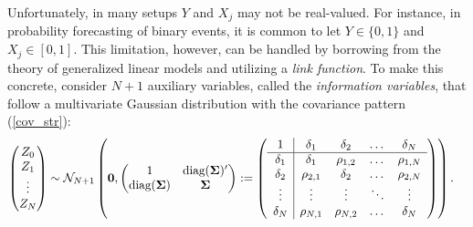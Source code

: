 \documentclass[11pt]{article}
\newcommand{\E}{\mathbb{E}}
\theoremstyle{definition}
\theoremstyle{definition}
\def\bSigma{{\bf \Sigma}}
\def\E{{\mathbb E}}
\def\diag{\text{diag}}
\def\diag{\text{diag}}
\begin{document}
Unfortunately, in many setups $Y$ and $X_j$ may not be real-valued. For instance, in probability forecasting of binary events, it is common to let $Y \in \{0,1\}$ and $X_j \in [0,1]$. This limitation, however, can be handled by borrowing from the theory of generalized linear models \citep{mccullagh1989generalized} and utilizing a \textit{link function}. To make this concrete, consider $N+1$ auxiliary variables, called the \textit{information variables}, that follow a multivariate Gaussian distribution with the covariance pattern (\ref{cov_str}):
\begin{align}
\left(\begin{matrix} Z_0 \\ Z_{1}\\ \vdots \\ Z_{N} \end{matrix}\right) &\sim \mathcal{N}_{N+1}\left( 
 \boldsymbol{0}, \left(\begin{matrix} 
1 & \diag(\bSigma)'\\
\diag(\bSigma) &\bSigma\\
 \end{matrix}\right) 
 :=
 \left(\begin{array}{c | c c cc }
1 & \delta_1 & \delta_2 & \dots & \delta_N  \\ \hline
\delta_1 & \delta_1 &\rho_{1,2} & \dots & \rho_{1,N}   \\ 
\delta_2 & \rho_{2,1} & \delta_2 & \dots & \rho_{2,N}  \\ 
\vdots & \vdots & \vdots & \ddots & \vdots  \\ 
\delta_N & \rho_{N,1} & \rho_{N,2} & \dots & \delta_N\\ 
 \end{array}\right)\right).  \label{NExperts}
\end{align}
\end{document}

